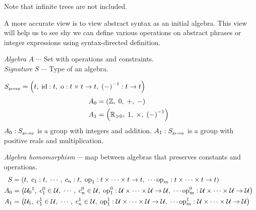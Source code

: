 \begin{enumcirc}
\begin{center}
	\end{center}
	Note that infinite trees are not included.
	\item
	A more accurate view is to view abstract syntax as an initial algebra.
	This view will help us to see shy we can define various operations on abstract
	phrases or integer expressions using syntax-directed definition.

	\item
	\emph{Algebra} $A$ $\cdots$ Set with operations and constraints. \\
	\emph{Signature} $S$ $\cdots$ Type of an algebra.
	\begin{exampletab}
		$S_{\textrm{\tiny group}} = \left( t,\; \textrm{id}: t ,\; \textrm{o} : t \times t \rightarrow t,\; \left( - \right)^{-1} : t \rightarrow t \right)$
		\begin{align*}
			A_0 & = \left( \mathbb{Z},\; 0,\; +,\; - \right)                         \\
			A_1 & = \left( \mathbb{R}_{>0} ,\; 1,\; \times,\; \left( - \right)^{-1} \right)
		\end{align*}
		$A_0: S_{\textrm{\tiny group}}$ is a group with integers and addition.
		$A_1: S_{\textrm{\tiny group}}$ is a group with positive reals and multiplication.
	\end{exampletab}
	\item
	\emph{Algebra homomorphism} $\cdots$ map between algebras that preserves
	constants and operations.
	\begin{align*}
		S   & = \prths{
			t,\; c_1 : t,\; \cdots ,\; c_n : t ,\;
			\textrm{op}_1 : t \times \cdots \times t \rightarrow t ,\; \cdots
			\textrm{op}_m : t \times \cdots \times t \rightarrow t
		}
		\\
		A_0 & = \prths{
			\mathcal{U}_0\footnotemark,\;
			c_1^0 \in \mathcal{U} ,\;
			\cdots ,\;
			c_n^0 \in \mathcal{U} ,\;
			\textrm{op}_1^0 :
			\mathcal{U} \times \cdots \times \mathcal{U} \rightarrow \mathcal{U},\; \cdots
			\textrm{op}_m^0 :
			\mathcal{U} \times \cdots \times \mathcal{U} \rightarrow \mathcal{U}
		}
		\\
		A_1 & = \prths{
			\mathcal{U}_1,\;
			c_1^1 \in \mathcal{U} ,\;
			\cdots ,\;
			c_n^1 \in \mathcal{U} ,\;
			\textrm{op}_1^1 :
			\mathcal{U} \times \cdots \times \mathcal{U} \rightarrow \mathcal{U},\; \cdots
			\textrm{op}_m^1 :
			\mathcal{U} \times \cdots \times \mathcal{U} \rightarrow \mathcal{U}
}
\end{align*}
\end{enumcirc}
